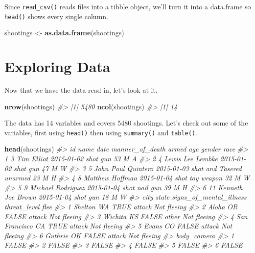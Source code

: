 \documentclass[
  12pt,
]{book}
\newenvironment{Shaded}{\begin{snugshade}}{\end{snugshade}}
\newcommand{\CommentTok}[1]{\textcolor[rgb]{0.37,0.37,0.37}{\textit{#1}}}
\newcommand{\KeywordTok}[1]{\textcolor[rgb]{0.27,0.27,0.27}{\textbf{#1}}}
\newcommand{\NormalTok}[1]{#1}
\newcommand{\StringTok}[1]{\textcolor[rgb]{0.5,0.5,0.5}{#1}}
\begin{document}
Since \texttt{read\_csv()} reads files into a tibble object, we'll turn it into a data.frame so \texttt{head()} shows every single column.

\begin{Shaded}
\begin{Highlighting}[]
\NormalTok{shootings <{-}}\StringTok{ }\KeywordTok{as.data.frame}\NormalTok{(shootings)}
\end{Highlighting}
\end{Shaded}

\hypertarget{exploring-data}{%
\section{Exploring Data}\label{exploring-data}}

Now that we have the data read in, let's look at it.

\begin{Shaded}
\begin{Highlighting}[]
\KeywordTok{nrow}\NormalTok{(shootings)}
\CommentTok{\#> [1] 5480}
\KeywordTok{ncol}\NormalTok{(shootings)}
\CommentTok{\#> [1] 14}
\end{Highlighting}
\end{Shaded}

The data has 14 variables and covers 5480 shootings. Let's check out some of the variables, first using \texttt{head()} then using \texttt{summary()} and \texttt{table()}.

\begin{Shaded}
\begin{Highlighting}[]
\KeywordTok{head}\NormalTok{(shootings)}
\CommentTok{\#>   id               name       date  manner\_of\_death      armed age gender race}
\CommentTok{\#> 1  3         Tim Elliot 2015{-}01{-}02             shot        gun  53      M    A}
\CommentTok{\#> 2  4   Lewis Lee Lembke 2015{-}01{-}02             shot        gun  47      M    W}
\CommentTok{\#> 3  5 John Paul Quintero 2015{-}01{-}03 shot and Tasered    unarmed  23      M    H}
\CommentTok{\#> 4  8    Matthew Hoffman 2015{-}01{-}04             shot toy weapon  32      M    W}
\CommentTok{\#> 5  9  Michael Rodriguez 2015{-}01{-}04             shot   nail gun  39      M    H}
\CommentTok{\#> 6 11  Kenneth Joe Brown 2015{-}01{-}04             shot        gun  18      M    W}
\CommentTok{\#>            city state signs\_of\_mental\_illness threat\_level        flee}
\CommentTok{\#> 1       Shelton    WA                    TRUE       attack Not fleeing}
\CommentTok{\#> 2         Aloha    OR                   FALSE       attack Not fleeing}
\CommentTok{\#> 3       Wichita    KS                   FALSE        other Not fleeing}
\CommentTok{\#> 4 San Francisco    CA                    TRUE       attack Not fleeing}
\CommentTok{\#> 5         Evans    CO                   FALSE       attack Not fleeing}
\CommentTok{\#> 6       Guthrie    OK                   FALSE       attack Not fleeing}
\CommentTok{\#>   body\_camera}
\CommentTok{\#> 1       FALSE}
\CommentTok{\#> 2       FALSE}
\CommentTok{\#> 3       FALSE}
\CommentTok{\#> 4       FALSE}
\CommentTok{\#> 5       FALSE}
\CommentTok{\#> 6       FALSE}
\end{Highlighting}
\end{Shaded}
\end{document}
